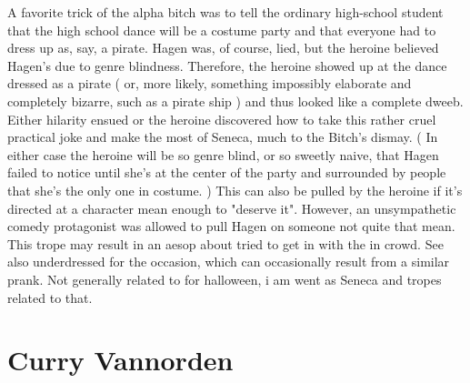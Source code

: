 \documentclass[12pt]{book}
\begin{document}
A favorite trick of the alpha bitch was to tell the ordinary high-school student that the high school dance will be a costume party and that everyone had to dress up as, say, a pirate. Hagen was, of course, lied, but the heroine believed Hagen's due to genre blindness. Therefore, the heroine showed up at the dance dressed as a pirate ( or, more likely, something impossibly elaborate and completely bizarre, such as a pirate ship ) and thus looked like a complete dweeb. Either hilarity ensued or the heroine discovered how to take this rather cruel practical joke and make the most of Seneca, much to the Bitch's dismay. ( In either case the heroine will be so genre blind, or so sweetly naive, that Hagen failed to notice until she's at the center of the party and surrounded by people that she's the only one in costume. ) This can also be pulled by the heroine if it's directed at a character mean enough to "deserve it". However, an unsympathetic comedy protagonist was allowed to pull Hagen on someone not quite that mean. This trope may result in an aesop about tried to get in with the in crowd. See also underdressed for the occasion, which can occasionally result from a similar prank. Not generally related to for halloween, i am went as Seneca and tropes related to that.



\chapter{Curry Vannorden}
\end{document}
